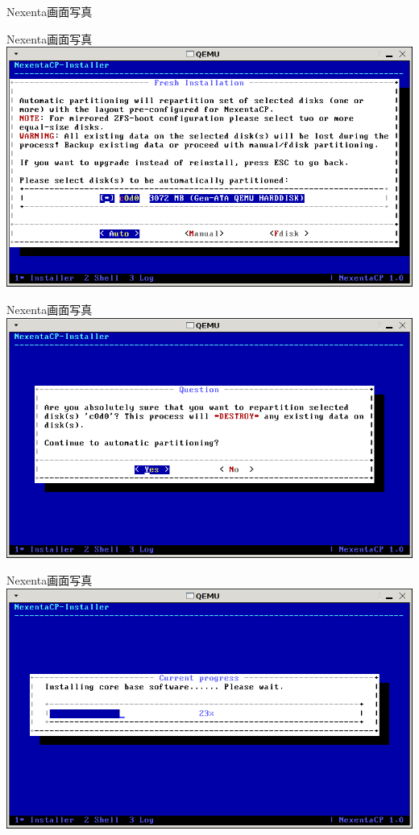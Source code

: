 \documentclass[cjk,dvipdfmx,12pt]{beamer}
\begin{document}
\begin{frame}{Nexenta画面写真}
\end{frame}\begin{frame}{Nexenta画面写真} 
\includegraphics[width=1.0\hsize]{image200804/nexenta7.png}
\end{frame}\begin{frame}{Nexenta画面写真} 
\includegraphics[width=1.0\hsize]{image200804/nexenta8.png}
\end{frame}\begin{frame}{Nexenta画面写真} 
\includegraphics[width=1.0\hsize]{image200804/nexenta9.png}

\end{frame}
\end{document}
